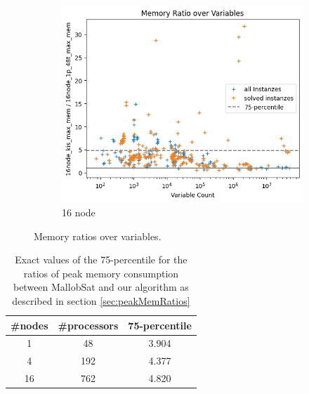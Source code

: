 \documentclass[12pt,a4paper,twoside]{scrartcl}
\numberwithin{equation}{section}
\begin{document}
\begin{figure}
  \begin{subfigure}[c]{.4\textwidth}
    \center
    \includegraphics[scale=.3]{plots/16node_compare/mem_ratio_over_vars.png}
    \caption{16 node}
    \label{fig:memRatiosVars16node}
  \end{subfigure}
  \caption{Memory ratios over variables.}
  \label{fig:memRatiosVars}
\end{figure}




\begin{table}
  \center
  \begin{tabular}{ ccc }
    \toprule
    \#nodes & \#processors & 75-percentile \\
    \midrule
    1  & 48  & 3.904\\
    4  & 192 & 4.377\\
    16 & 762 & 4.820\\
    \bottomrule
  \end{tabular}
  \caption{Exact values of the 75-percentile for the ratios of peak memory consumption between MallobSat and our algorithm as described in section \ref{sec:peakMemRatios}}
  \label{tab:memRatioPercentiles}
\end{table}
\end{document}
